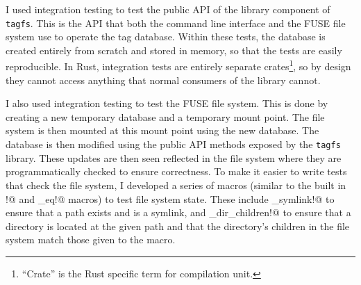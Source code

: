 I used integration testing to test the public API of the library component of
\texttt{tagfs}. This is the API that both the command line interface and the
FUSE file system use to operate the tag database. Within these tests, the
database is created entirely from scratch and stored in memory, so that the
tests are easily reproducible. In Rust, integration tests are entirely separate
crates\footnote{``Crate'' is the Rust specific term for compilation unit.}, so
by design they cannot access anything that normal consumers of the library
cannot.

I also used integration testing to test the FUSE file system. This is done by
creating a new temporary database and a temporary mount point. The file system
is then mounted at this mount point using the new database. The database is
then modified using the public API methods exposed by the \texttt{tagfs}
library. These updates are then seen reflected in the file system where they
are programmatically checked to ensure correctness. To make it easier to write
tests that check the file system, I developed a series of macros (similar to
the built in \verb@assert!@ and \verb@assert_eq!@ macros) to test file system
state. These include \verb@assert_symlink!@ to ensure that a path exists and is
a symlink, and \verb@assert_dir_children!@ to ensure that a directory is
located at the given path and that the directory's children in the file system
match those given to the macro.
